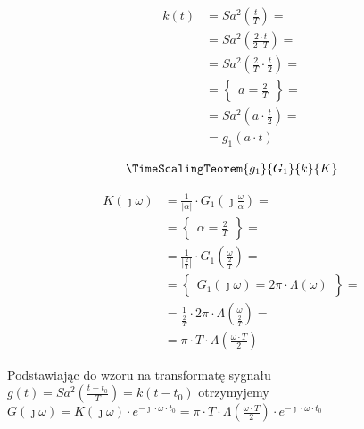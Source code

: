 \begin{task}
\begin{align*}
k(t)&=Sa^2\left(\frac{t}{T}\right)=\\
&=Sa^2\left(\frac{2\cdot t}{2\cdot T}\right)=\\
&=Sa^2\left(\frac{2}{T} \cdot \frac{t}{2}\right)=\\
&=\begin{Bmatrix}
a = \frac{2}{T}
\end{Bmatrix}=\\
&=Sa^2\left(a \cdot \frac{t}{2}\right)=\\
&=g_1(a\cdot t) 
\end{align*}


\begin{align*}
\TimeScalingTeorem{g_1}{G_1}{k}{K}
\end{align*}

\begin{align*}
K(\jmath \omega) &= \frac{1}{\left|\alpha \right|} \cdot G_1(\jmath \frac{\omega}{\alpha})=\\
&=\begin{Bmatrix}
\alpha = \frac{2}{T}
\end{Bmatrix}=\\
&=\frac{1}{\left| \frac{2}{T} \right|} \cdot G_1( \frac{\omega}{\frac{2}{T}})=\\
&=\begin{Bmatrix}%
G_1(\jmath \omega) = 2\pi \cdot \Lambda\left(\omega\right)
\end{Bmatrix}=\\
&=\frac{1}{ \frac{2}{T}} \cdot 2\pi \cdot \Lambda\left( \frac{\omega}{\frac{2}{T}}\right)=\\
&=\pi \cdot T \cdot \Lambda\left( \frac{\omega \cdot T}{2}\right)
\end{align*}


Podstawiając do wzoru na transformatę sygnału $g(t)=Sa^2\left(\frac{t-t_0}{T}\right)=k(t-t_0)$ otrzymyjemy $G(\jmath \omega)=K(\jmath \omega)\cdot e^{-\jmath \cdot \omega \cdot t_0} = \pi \cdot T \cdot \Lambda\left( \frac{\omega \cdot T}{2}\right) \cdot e^{-\jmath \cdot \omega \cdot t_0}$


\end{task}
